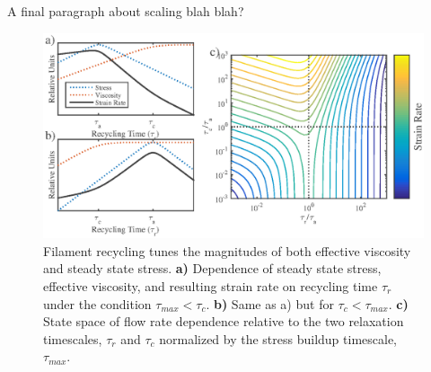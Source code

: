 \documentclass[10pt,letterpaper]{article}
\begin{document}
A final paragraph about scaling blah blah?






\begin{figure}[h!]
	\centering
	\includegraphics[width=\hsize]{figures/figure9}
	\caption{\label{fig:flow_theo}  Filament recycling tunes the magnitudes of both effective viscosity and steady state stress. \textbf{a)}  Dependence of steady state stress, effective viscosity, and resulting strain rate on recycling time $\tau_r$ under the condition $\tau_{max}<\tau_c$. \textbf{b)} Same as a) but for $\tau_c<\tau_{max}$.  \textbf{c)} State space of flow rate dependence relative to the two relaxation timescales, $\tau_r$ and $\tau_c$ normalized by the stress buildup timescale, $\tau_{max}$.  }
\end{figure}
\end{document}
